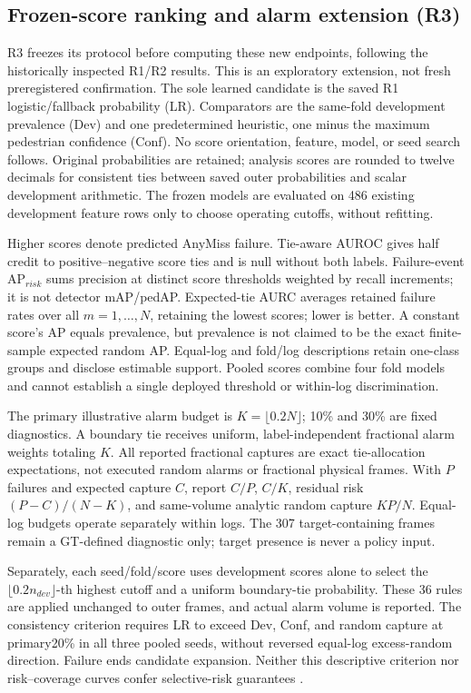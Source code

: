 \documentclass[conference]{IEEEtran}
\begin{document}
\subsection{Frozen-score ranking and alarm extension (R3)}
R3 freezes its protocol before computing these new endpoints, following the historically inspected R1/R2 results. This is an exploratory extension, not fresh preregistered confirmation. The sole learned candidate is the saved R1 logistic/fallback probability (LR). Comparators are the same-fold development prevalence (Dev) and one predetermined heuristic, one minus the maximum pedestrian confidence (Conf). No score orientation, feature, model, or seed search follows. Original probabilities are retained; analysis scores are rounded to twelve decimals for consistent ties between saved outer probabilities and scalar development arithmetic. The frozen models are evaluated on 486 existing development feature rows only to choose operating cutoffs, without refitting.

Higher scores denote predicted AnyMiss failure. Tie-aware AUROC gives half credit to positive--negative score ties and is null without both labels. Failure-event $\mathrm{AP}_{risk}$ sums precision at distinct score thresholds weighted by recall increments; it is not detector mAP/pedAP. Expected-tie AURC averages retained failure rates over all $m=1,\ldots,N$, retaining the lowest scores; lower is better. A constant score's AP equals prevalence, but prevalence is not claimed to be the exact finite-sample expected random AP. Equal-log and fold/log descriptions retain one-class groups and disclose estimable support. Pooled scores combine four fold models and cannot establish a single deployed threshold or within-log discrimination.

The primary illustrative alarm budget is $K=\lfloor0.2N\rfloor$; 10\% and 30\% are fixed diagnostics. A boundary tie receives uniform, label-independent fractional alarm weights totaling $K$. All reported fractional captures are exact tie-allocation expectations, not executed random alarms or fractional physical frames. With $P$ failures and expected capture $C$, report $C/P$, $C/K$, residual risk $(P-C)/(N-K)$, and same-volume analytic random capture $KP/N$. Equal-log budgets operate separately within logs. The 307 target-containing frames remain a GT-defined diagnostic only; target presence is never a policy input.

Separately, each seed/fold/score uses development scores alone to select the $\lfloor0.2n_{dev}\rfloor$-th highest cutoff and a uniform boundary-tie probability. These 36 rules are applied unchanged to outer frames, and actual alarm volume is reported. The consistency criterion requires LR to exceed Dev, Conf, and random capture at primary20\% in all three pooled seeds, without reversed equal-log excess-random direction. Failure ends candidate expansion. Neither this descriptive criterion nor risk--coverage curves confer selective-risk guarantees \cite{Geifman2017Selective}.
\end{document}
